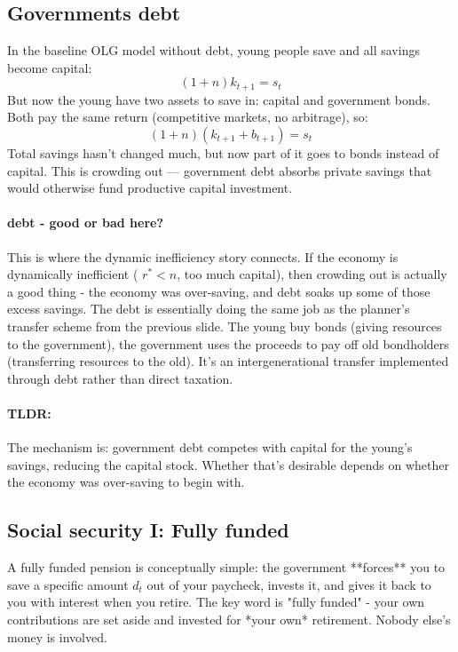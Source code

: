 \documentclass[12pt]{article}
\begin{document}
\subsection{Governments debt}
In the baseline OLG model without debt, young people save and all savings become capital:
$$
(1+n) k_{t+1}=s_t
$$
But now the young have two assets to save in: capital and government bonds. Both pay the same return (competitive markets, no arbitrage), so:
$$
(1+n)\left(k_{t+1}+b_{t+1}\right)=s_t
$$
Total savings hasn't changed much, but now part of it goes to bonds instead of capital. This is crowding out — government debt absorbs private savings that would otherwise fund productive capital investment.
\paragraph{debt - good or bad here?}
This is where the dynamic inefficiency story connects. If the economy is dynamically inefficient ( $r^*<n$, too much capital), then crowding out is actually a good thing - the economy was over-saving, and debt soaks up some of those excess savings. The debt is essentially doing the same job as the planner's transfer scheme from the previous slide. The young buy bonds (giving resources to the government), the government uses the proceeds to pay off old bondholders (transferring resources to the old). It's an intergenerational transfer implemented through debt rather than direct taxation.
\paragraph{TLDR:}
The mechanism is: government debt competes with capital for the young's savings, reducing the capital stock. Whether that's desirable depends on whether the economy was over-saving to begin with.

\subsection{Social security I: Fully funded}
A fully funded pension is conceptually simple: the government **forces** you to save a specific amount $d_t$ out of your paycheck, invests it, and gives it back to you with interest when you retire. The key word is "fully funded" - your own contributions are set aside and invested for *your own* retirement. Nobody else's money is involved.
\end{document}
